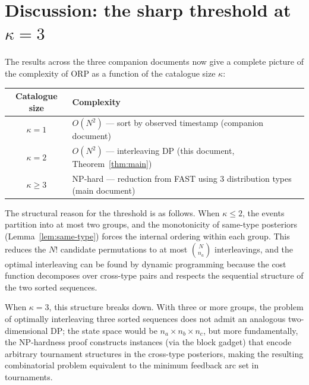 \documentclass[11pt]{article}
\begin{document}
\section{Discussion: the sharp threshold at $\kappa = 3$}

The results across the three companion documents now give a complete picture of the complexity of ORP as a function of the catalogue size $\kappa$:

\begin{center}
\renewcommand{\arraystretch}{1.3}
\begin{tabular}{@{}cl@{}}
\hline
\textbf{Catalogue size} & \textbf{Complexity} \\
\hline
$\kappa = 1$ & $O(N^2)$ --- sort by observed timestamp (companion document) \\
$\kappa = 2$ & $O(N^2)$ --- interleaving DP (this document, Theorem~\ref{thm:main}) \\
$\kappa \ge 3$ & NP-hard --- reduction from FAST using $3$ distribution types (main document) \\
\hline
\end{tabular}
\end{center}

The structural reason for the threshold is as follows. When $\kappa \le 2$, the events partition into at most two groups, and the monotonicity of same-type posteriors (Lemma~\ref{lem:same-type}) forces the internal ordering within each group. This reduces the $N!$ candidate permutations to at most $\binom{N}{n_a}$ interleavings, and the optimal interleaving can be found by dynamic programming because the cost function decomposes over cross-type pairs and respects the sequential structure of the two sorted sequences.

When $\kappa = 3$, this structure breaks down. With three or more groups, the problem of optimally interleaving three sorted sequences does not admit an analogous two-dimensional DP; the state space would be $n_a \times n_b \times n_c$, but more fundamentally, the NP-hardness proof constructs instances (via the block gadget) that encode arbitrary tournament structures in the cross-type posteriors, making the resulting combinatorial problem equivalent to the minimum feedback arc set in tournaments.
\end{document}
